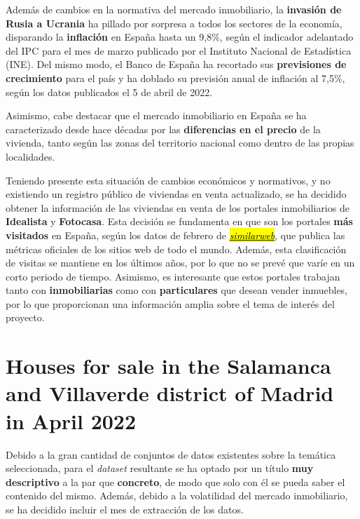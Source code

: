 \documentclass[12pt]{article}
\begin{document}
Además de cambios en la normativa del mercado inmobiliario, la \textbf{invasión de Rusia a Ucrania} ha pillado por sorpresa a todos los sectores de la economía, disparando la \textbf{inflación} en España hasta un 9,8\%, según el indicador adelantado del IPC para el mes de marzo publicado por el Instituto Nacional de Estadística (INE). Del mismo modo, el Banco de España ha recortado sus \textbf{previsiones de crecimiento} para el país y ha doblado su previsión anual de inflación al 7,5\%, según los datos publicados el 5 de abril de 2022.

Asimismo, cabe destacar que el mercado inmobiliario en España se ha caracterizado desde hace décadas por las \textbf{diferencias en el precio} de la vivienda, tanto según las zonas del territorio nacional como dentro de las propias localidades. 

Teniendo presente esta situación de cambios económicos y normativos, y no existiendo un registro público de viviendas en venta actualizado, se ha decidido obtener la información de las viviendas en venta de los portales inmobiliarios de \textbf{Idealista} y \textbf{Fotocasa}. Esta decisión se fundamenta en que son los portales \textbf{más visitados} en España, según los datos de febrero de \href{https://www.similarweb.com/top-websites/spain/category/business-and-consumer-services/real-estate/}{\hl{\textit{similarweb}}}, que publica las métricas oficiales de los sitios web de todo el mundo. Además, esta clasificación de visitas se mantiene en los últimos años, por lo que no se prevé que varíe en un corto periodo de tiempo. Asimismo, es interesante que estos portales trabajan tanto con \textbf{inmobiliarias} como con \textbf{particulares} que desean vender inmuebles, por lo que proporcionan una información amplia sobre el tema de interés del proyecto.


\vspace{-1.5em}\section{Houses for sale in the Salamanca and Villaverde district of Madrid in April 2022}\vspace{-1.0em}

Debido a la gran cantidad de conjuntos de datos existentes sobre la temática seleccionada, para el \textit{dataset} resultante se ha optado por un título \textbf{muy descriptivo} a la par que \textbf{concreto}, de modo que solo con él se pueda saber el contenido del mismo. Además, debido a la volatilidad del mercado inmobiliario, se ha decidido incluir el mes de extracción de los datos.
\end{document}
